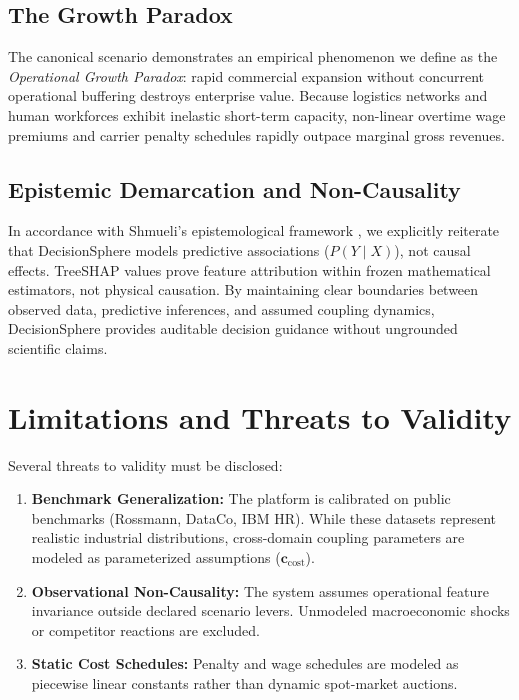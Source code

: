 \documentclass[10pt,conference]{IEEEtran}
\begin{document}
\subsection{The Growth Paradox}
The canonical scenario demonstrates an empirical phenomenon we define as the \textit{Operational Growth Paradox}: rapid commercial expansion without concurrent operational buffering destroys enterprise value. Because logistics networks and human workforces exhibit inelastic short-term capacity, non-linear overtime wage premiums and carrier penalty schedules rapidly outpace marginal gross revenues.

\subsection{Epistemic Demarcation and Non-Causality}
In accordance with Shmueli's epistemological framework \cite{shmueli2010explain}, we explicitly reiterate that DecisionSphere models predictive associations ($P(Y \mid X)$), not causal effects. TreeSHAP values prove feature attribution within frozen mathematical estimators, not physical causation. By maintaining clear boundaries between observed data, predictive inferences, and assumed coupling dynamics, DecisionSphere provides auditable decision guidance without ungrounded scientific claims.

\section{Limitations and Threats to Validity}

Several threats to validity must be disclosed:
\begin{enumerate}
    \item \textbf{Benchmark Generalization:} The platform is calibrated on public benchmarks (Rossmann, DataCo, IBM HR). While these datasets represent realistic industrial distributions, cross-domain coupling parameters are modeled as parameterized assumptions ($\mathbf{c}_{\text{cost}}$).
    \item \textbf{Observational Non-Causality:} The system assumes operational feature invariance outside declared scenario levers. Unmodeled macroeconomic shocks or competitor reactions are excluded.
    \item \textbf{Static Cost Schedules:} Penalty and wage schedules are modeled as piecewise linear constants rather than dynamic spot-market auctions.
\end{enumerate}
\end{document}
